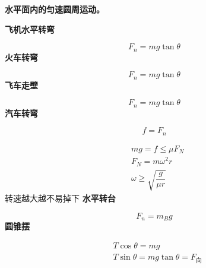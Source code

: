 \textbf{水平面内的匀速圆周运动。}

\textbf{飞机水平转弯}


\[ F_n=mg\tan\theta \]
\textbf{火车转弯}


\[ F_n=mg\tan\theta \]
\textbf{飞车走壁}


\[ F_n=mg\tan\theta \]
\textbf{汽车转弯}


\[ f=F_n \]

\begin{align*}
& mg=f\le\mu F_N\\
& F_N=m\omega^2 r\\
& \omega\ge\sqrt{\dfrac{g}{\mu r}}
\end{align*}
转速越大越不易掉下
\textbf{水平转台}


\[ F_n=m_Bg \]
\textbf{圆锥摆}


\begin{align*}
& T\cos\theta=mg\\
& T\sin\theta=mg\tan\theta=F_{\text{向}}
\end{align*}

